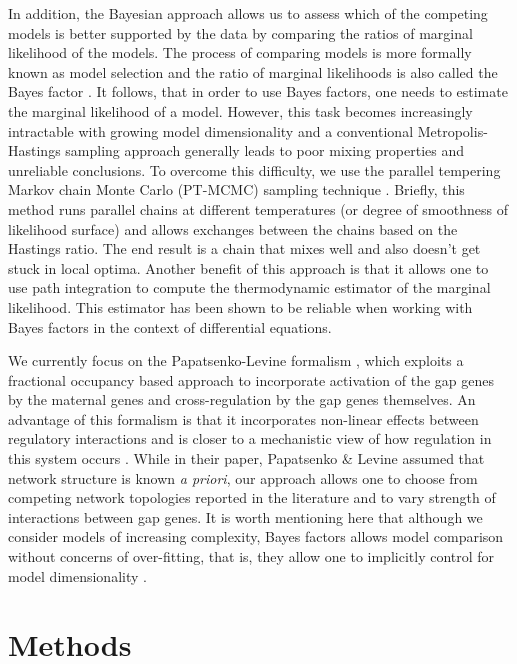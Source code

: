 In addition, the Bayesian approach allows us to assess which of the competing models is better supported by the data by comparing the ratios of marginal likelihood of the models. The process of comparing models is more formally known as model selection and the ratio of marginal likelihoods is also called the Bayes factor \cite{raftery95}. It follows, that in order to use Bayes factors, one needs to estimate the marginal likelihood of a model.  However, this task becomes increasingly intractable with growing model dimensionality and a conventional Metropolis-Hastings sampling approach generally leads to poor mixing properties and unreliable conclusions. To overcome this difficulty, we use the parallel tempering Markov chain Monte Carlo (PT-MCMC) sampling technique \cite{geyer91}. Briefly, this method runs parallel chains at different temperatures (or degree of smoothness of likelihood surface) and allows exchanges between the chains based on the Hastings ratio. The end result is a chain that mixes well and also doesn’t get stuck in local optima. Another benefit of this approach is that it allows one to use path integration to compute the thermodynamic estimator \cite{meng98} of the marginal likelihood. This estimator has been shown to be reliable when working with Bayes factors \cite{calderhead10} in the context of differential equations. 

We currently focus on the Papatsenko-Levine formalism \cite{papatsenko11}, which exploits a fractional occupancy based approach to incorporate activation of the gap genes by the maternal genes and cross-regulation by the gap genes themselves. An advantage of this formalism is that it incorporates non-linear effects between regulatory interactions and is closer to a mechanistic view of how regulation in this system occurs \cite{jaeger06a}. While in their paper, Papatsenko \& Levine assumed that network structure is known \textit{a priori}, our approach allows one to choose from competing network topologies reported in the literature and to vary strength of interactions between gap genes. It is worth mentioning here that although we consider models of increasing complexity, Bayes factors allows model comparison without concerns of over-fitting, that is, they allow one to implicitly control for model dimensionality \cite{jeffreys92}.	

\section{Methods}

